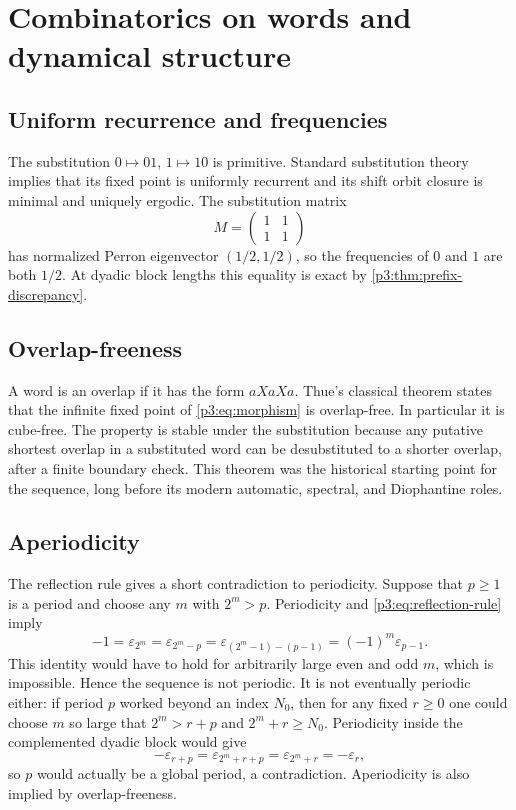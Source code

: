 \documentclass[11pt,oneside]{article}
\theoremstyle{definition}
\theoremstyle{remark}
\newcommand{\eps}{\varepsilon}
\begin{document}
\section{Combinatorics on words and dynamical structure}

\subsection{Uniform recurrence and frequencies}

The substitution $0\mapsto01$, $1\mapsto10$ is primitive.  Standard
substitution theory implies that its fixed point is uniformly recurrent and
its shift orbit closure is minimal and uniquely ergodic.  The substitution
matrix
\begin{equation}\label{p3:eq:substitution-matrix}
 M=\begin{pmatrix}1&1\\1&1\end{pmatrix}
\end{equation}
has normalized Perron eigenvector $(1/2,1/2)$, so the frequencies of $0$ and
$1$ are both $1/2$.  At dyadic block lengths this equality is exact by
\cref{p3:thm:prefix-discrepancy}.

\subsection{Overlap-freeness}

A word is an overlap if it has the form $aXaXa$.  Thue's classical theorem
states that the infinite fixed point of \cref{p3:eq:morphism} is overlap-free.
In particular it is cube-free.  The property is stable under the substitution
because any putative shortest overlap in a substituted word can be desubstituted
to a shorter overlap, after a finite boundary check.  This theorem was the
historical starting point for the sequence, long before its modern automatic,
spectral, and Diophantine roles.

\subsection{Aperiodicity}\label{p3:subsec:aperiodicity}

The reflection rule gives a short contradiction to periodicity.  Suppose that
$p\ge1$ is a period and choose any $m$ with $2^m>p$.  Periodicity and
\cref{p3:eq:reflection-rule} imply
\[
 -1=\eps_{2^m}=\eps_{2^m-p}
    =\eps_{(2^m-1)-(p-1)}=(-1)^m\eps_{p-1}.
\]
This identity would have to hold for arbitrarily large even and odd $m$, which
is impossible.  Hence the sequence is not periodic.  It is not eventually
periodic either: if period $p$ worked beyond an index $N_0$, then for any fixed
$r\ge0$ one could choose $m$ so large that $2^m>r+p$ and $2^m+r\ge N_0$.
Periodicity inside the complemented dyadic block would give
\[
 -\eps_{r+p}=\eps_{2^m+r+p}=\eps_{2^m+r}=-\eps_r,
\]
so $p$ would actually be a global period, a contradiction.  Aperiodicity is
also implied by overlap-freeness.
\end{document}
